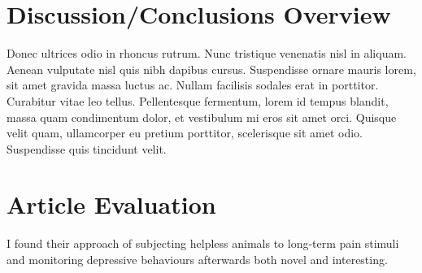 \documentclass[
10pt, %
a4paper, %
twocolumn, %
landscape %
]{article}
\begin{document}

\section{Discussion/Conclusions Overview}

Donec ultrices odio in rhoncus rutrum. Nunc tristique venenatis nisl in aliquam. Aenean vulputate nisl quis nibh dapibus cursus. Suspendisse ornare mauris lorem, sit amet gravida massa luctus ac. Nullam facilisis sodales erat in porttitor. Curabitur vitae leo tellus. Pellentesque fermentum, lorem id tempus blandit, massa quam condimentum dolor, et vestibulum mi eros sit amet orci. Quisque velit quam, ullamcorper eu pretium porttitor, scelerisque sit amet odio. Suspendisse quis tincidunt velit. 


\section*{Article Evaluation}

I found their approach of subjecting helpless animals to long-term pain stimuli and monitoring depressive behaviours afterwards both novel and interesting.


\renewcommand{\refname}{Reference} %


\end{document}
